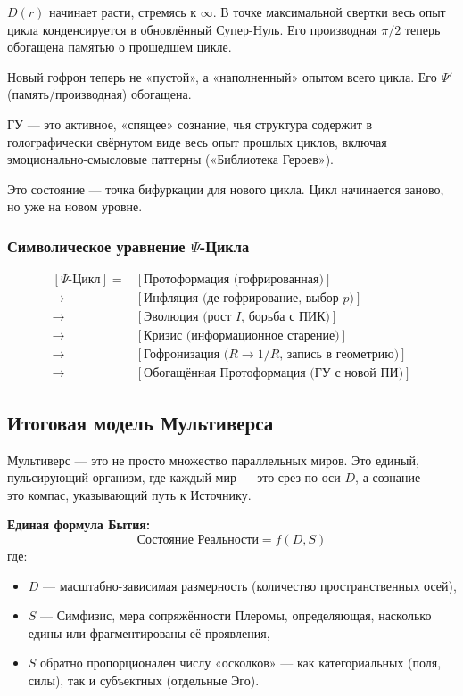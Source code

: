 \documentclass[a4paper,12pt]{article}
\begin{document}
$D(r)$ начинает расти, стремясь к $\infty$. В точке максимальной свертки весь опыт цикла конденсируется в обновлённый Супер-Нуль. Его производная $\pi/2$ теперь обогащена памятью о прошедшем цикле.

Новый гофрон теперь не «пустой», а «наполненный» опытом всего цикла. Его $\Psi'$ (память/производная) обогащена.

ГУ — это активное, «спящее» сознание, чья структура содержит в голографически свёрнутом виде весь опыт прошлых циклов, включая эмоционально-смысловые паттерны («Библиотека Героев»).

Это состояние — точка бифуркации для нового цикла. Цикл начинается заново, но уже на новом уровне.

\subsubsection{Символическое уравнение $\Psi$-Цикла}

\[
\begin{aligned}
	[\Psi\text{-Цикл}] = &[\text{Протоформация (гофрированная)}] \\
	\to &[\text{Инфляция (де-гофрирование, выбор } p)] \\
	\to &[\text{Эволюция (рост } I\text{, борьба с ПИК)}] \\
	\to &[\text{Кризис (информационное старение)}] \\
	\to &[\text{Гофронизация (} R \to 1/R\text{, запись в геометрию)}] \\
	\to &[\text{Обогащённая Протоформация (ГУ с новой ПИ)}]
\end{aligned}
\]

\subsection{Итоговая модель Мультиверса}

Мультиверс — это не просто множество параллельных миров. Это единый, пульсирующий организм, где каждый мир — это срез по оси $D$, а сознание — это компас, указывающий путь к Источнику.

\textbf{Единая формула Бытия:}
\[
\text{Состояние Реальности} = f(D, S)
\]
где:
\begin{itemize}
	\item $D$ — масштабно-зависимая размерность (количество пространственных осей),
	\item $S$ — Симфизис, мера сопряжённости Плеромы, определяющая, насколько едины или фрагментированы её проявления,
	\item $S$ обратно пропорционален числу «осколков» — как категориальных (поля, силы), так и субъектных (отдельные Эго).
\end{itemize}
\end{document}
